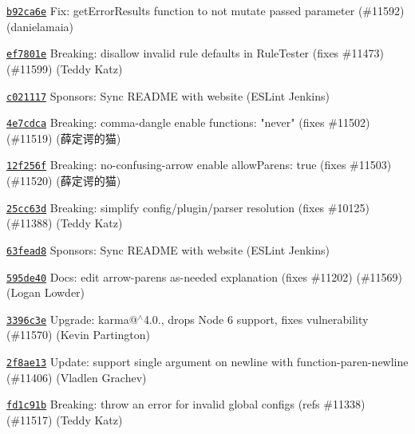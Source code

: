 \begin{DoxyItemize}
\item \href{https://github.com/eslint/eslint/commit/b92ca6ea8ae46b92c258921e8b5b40f5035dbc43}{\texttt{ {\ttfamily b92ca6e}}} Fix\+: get\+Error\+Results function to not mutate passed parameter (\#11592) (danielamaia)
\item \href{https://github.com/eslint/eslint/commit/ef7801ea510e12a9ca4963bcc8ec7e3aacc75ff0}{\texttt{ {\ttfamily ef7801e}}} Breaking\+: disallow invalid rule defaults in Rule\+Tester (fixes \#11473) (\#11599) (Teddy Katz)
\item \href{https://github.com/eslint/eslint/commit/c021117915d5d23399233f761a237e138f1854af}{\texttt{ {\ttfamily c021117}}} Sponsors\+: Sync README with website (ESLint Jenkins)
\item \href{https://github.com/eslint/eslint/commit/4e7cdca571632a3f3c32b39eb03022fe88ca8b30}{\texttt{ {\ttfamily 4e7cdca}}} Breaking\+: comma-\/dangle enable functions\+: "{}never"{} (fixes \#11502) (\#11519) (薛定谔的猫)
\item \href{https://github.com/eslint/eslint/commit/12f256f22534c4a4e1ca0ba54c37c6db81441461}{\texttt{ {\ttfamily 12f256f}}} Breaking\+: no-\/confusing-\/arrow enable allow\+Parens\+: true (fixes \#11503) (\#11520) (薛定谔的猫)
\item \href{https://github.com/eslint/eslint/commit/25cc63d47e6c0aea8b88589a088c1f0de5f6f1cc}{\texttt{ {\ttfamily 25cc63d}}} Breaking\+: simplify config/plugin/parser resolution (fixes \#10125) (\#11388) (Teddy Katz)
\item \href{https://github.com/eslint/eslint/commit/63fead86f8cf4e6b33d5424fb7db1e76a66d4cce}{\texttt{ {\ttfamily 63fead8}}} Sponsors\+: Sync README with website (ESLint Jenkins)
\item \href{https://github.com/eslint/eslint/commit/595de4074fac1b5839f56b29fe0106a7fda7e3e0}{\texttt{ {\ttfamily 595de40}}} Docs\+: edit arrow-\/parens as-\/needed explanation (fixes \#11202) (\#11569) (Logan Lowder)
\item \href{https://github.com/eslint/eslint/commit/3396c3e2231b5b6e16da8751c22c86c256590f6b}{\texttt{ {\ttfamily 3396c3e}}} Upgrade\+: karma@\texorpdfstring{$^\wedge$}{\string^}4.0., drops Node 6 support, fixes vulnerability (\#11570) (Kevin Partington)
\item \href{https://github.com/eslint/eslint/commit/2f8ae1397eef3625fe66636e95b0b312c6ff8a37}{\texttt{ {\ttfamily 2f8ae13}}} Update\+: support single argument on newline with function-\/paren-\/newline (\#11406) (Vladlen Grachev)
\item \href{https://github.com/eslint/eslint/commit/fd1c91b00e8d8c3a83d21e60668d5f1fa61cb214}{\texttt{ {\ttfamily fd1c91b}}} Breaking\+: throw an error for invalid global configs (refs \#11338) (\#11517) (Teddy Katz)

\end{DoxyItemize}
